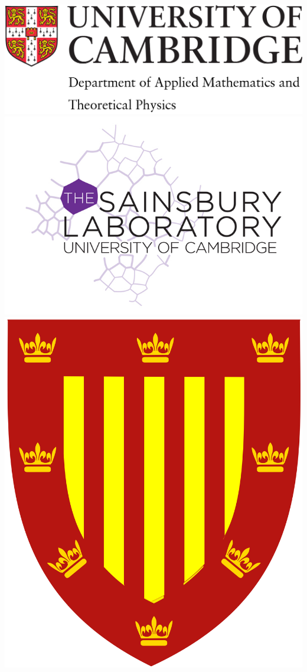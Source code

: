 \documentclass{beamer}
\begin{document}
{\begin{frame}
  \includegraphics[height=0.15\textheight]{damtp}\hspace{8mm}
  \includegraphics[height=0.15\textheight]{slcu}\hspace{8mm}
  \includegraphics[height=0.15\textheight]{peterhouse}\hspace{8mm}

\end{frame}}
\end{document}
